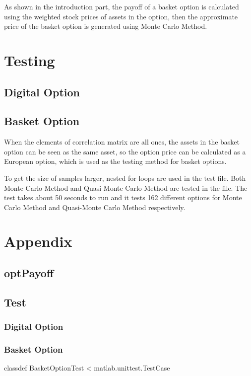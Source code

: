 \documentclass[]{elsarticle}
\theoremstyle{definition}
\theoremstyle{remark}
\begin{document}
As shown in the introduction part, the payoff of a basket option is calculated using the weighted stock prices of assets in the option, then the approximate price of the basket option is generated using Monte Carlo Method.

\section{Testing}
\subsection{Digital Option}

\subsection{Basket Option}
When the elements of correlation matrix are all ones, the assets in the basket option can be seen as the same asset, so the option price can be calculated as a European option, which is used as the testing method for basket options.

To get the size of samples larger, nested for loops are used in the test file. Both Monte Carlo Method and Quasi-Monte Carlo Method are tested in the file. The test takes about 50 seconds to run and it tests 162 different options for Monte Carlo Method and Quasi-Monte Carlo Method respectively.

\section*{Appendix}
\subsection*{optPayoff}
\subsection*{Test}
\subsubsection*{Digital Option}
\subsubsection*{Basket Option}
classdef BasketOptionTest < matlab.unittest.TestCase\\
    
\end{document}
